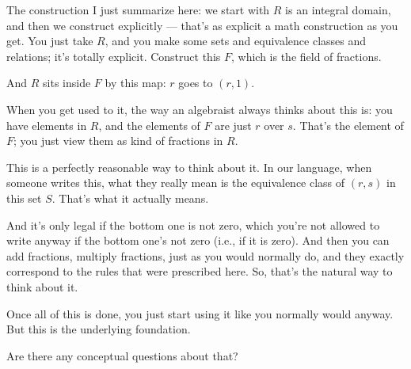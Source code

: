 \begin{speech}[01:08:00 - 01:09:44]
The construction I just summarize here:  we start with $R$ is an integral domain,  and then we construct explicitly --- that's as explicit a math construction as you get. You just take $R$, and you make some sets and equivalence classes and relations; it's totally explicit. Construct this $F$, which is the field of fractions. 

And $R$ sits inside $F$ by this map: $r$ goes to $(r, 1)$. 

When you get used to it, the way an algebraist always thinks about this is: you have elements in $R$,  and the elements of $F$ are just $r$ over $s$. That's the element of $F$; you just view them as kind of fractions in $R$. 

This is a perfectly reasonable way to think about it. In our language, when someone writes this, what they really mean is the equivalence class of $(r, s)$ in this set $S$. That's what it actually means. 

And it's only legal if the bottom one is not zero, which you're not allowed to write anyway if the bottom one's not zero (i.e., if it is zero). And then you can add fractions, multiply fractions, just as you would normally do, and they exactly correspond to the rules that were prescribed here. So, that's the natural way to think about it.

Once all of this is done, you just start using it like you normally would anyway. But this is the underlying foundation.

Are there any conceptual questions about that?
\end{speech}

